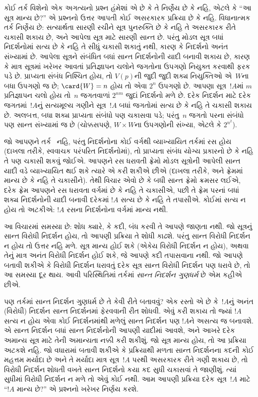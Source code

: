 કોઈ તર્ક વિશેનો એક અગત્યનો પ્રશ્ન હંમેશાં એ છે કે તે નિર્ણેય છે કે
નહિ, એટલે કે ``આ સૂત્ર માન્ય છે?'' એ પ્રશ્નનો ઉત્તર આપતી
કોઈ અસરકારક પ્રક્રિયા છે કે નહિ. વિધાનાત્મક તર્ક નિર્ણેય છે:
સત્યાર્થતા સારણી રચીને સૂત્ર પુનરુક્તિ છે કે નહિ તે
અસરકારક રીતે ચકાસી શકાય છે, અને આપેલા સૂત્ર માટે સારણી
સાન્ત છે. પરંતુ મોડલ સૂત્ર બધાં નિદર્શનોમાં સત્ય છે કે નહિ તે સીધું
ચકાસી શકાતું નથી, કારણ કે નિદર્શનો અનંત સંખ્યામાં છે. આપેલા સૂત્રને
સંબંધિત બધાં સાન્ત નિદર્શનોની યાદી બનાવી શકાય છે, કારણ કે માત્ર
સૂત્રમાં ખરેખર આવતાં પ્રતિજ્ઞાપન ચલોને જગતોના
ઉપગણો નિયુક્ત કરવાથી ફરક પડે છે. પ્રાપ્યતા સંબંધ નિશ્ચિત હોય, તો
$V(p)$ની જુદી જુદી શક્ય નિયુક્તિઓ એ~$W$ના બધા ઉપગણો જ છે;
$\card{W} = n$ હોય તો એવા $2^n$ ઉપગણો છે. આપણા
સૂત્ર~$!A$માં $m$ પ્રતિજ્ઞાપન ચલો હોય તો~$n$ જગતવાળાં $2^{nm}$ જુદાં નિદર્શનો મળે છે.
દરેક નિદર્શન માટે દરેક જગતમાં~$!A$નું સત્યમૂલ્ય ગણીને સૂત્ર~$!A$
બધાં જગતોમાં સત્ય છે કે નહિ તે ચકાસી શકાય છે. અલબત્ત, બધા શક્ય
પ્રાપ્યતા સંબંધો પણ ચકાસવા પડે; પરંતુ~$n$ જગતો પરના સંબંધો પણ
સાન્ત સંખ્યામાં જ છે (ચોક્કસપણે, $W \times W$ના ઉપગણોની સંખ્યા,
એટલે કે $2^{n^2}$).

જો આપણને તર્ક~ નહિ, પરંતુ નિદર્શનોના કોઈ વર્ગથી
વ્યાખ્યાયિત તર્કમાં રસ હોય (દાખલા તરીકે, સ્વવાચક પરંપરિત
નિદર્શનોમાં), તો પ્રાપ્યતા સંબંધ યોગ્ય પ્રકારનો છે કે નહિ તે પણ
ચકાસી શકવું જોઈએ. આપણને રસ ધરાવતી ફ્રેમો મોડલ સૂત્રોની
આપેલી સાન્ત યાદી વડે વ્યાખ્યાયિત થઈ શકે ત્યારે એ કરી શકીએ છીએ (દાખલા તરીકે,
 અને  ફ્રેમમાં માન્ય છે કે નહિ તે ચકાસીને). તેથી વિચાર
એવો છે કે બધી સાન્ત ફ્રેમો ક્રમસર લઈએ, દરેક ફ્રેમ આપણને રસ ધરાવતા
વર્ગમાં છે કે નહિ તે ચકાસીએ, પછી તે ફ્રેમ પરનાં બધાં શક્ય
નિદર્શનોની યાદી બનાવી દરેકમાં $!A$ સત્ય છે કે નહિ તે તપાસીએ.
કોઈમાં સત્ય ન હોય તો અટકીએ: $!A$ રસના નિદર્શનોના વર્ગમાં માન્ય
નથી.

આ વિચારમાં સમસ્યા છે: શોધ ક્યારે, કે કદી, બંધ કરવી તે આપણે જાણતા
નથી. જો સૂત્રનું સાન્ત વિરોધી નિદર્શન હોય, તો આપણી પ્રક્રિયા
તે શોધી કાઢશે. પરંતુ સાન્ત વિરોધી નિદર્શન ન હોય તો ઉત્તર નહિ મળે.
સૂત્ર માન્ય હોઈ શકે (એકેય વિરોધી નિદર્શન ન હોય), અથવા તેનું
માત્ર અનંત વિરોધી નિદર્શન હોઈ શકે, જે આપણે કદી તપાસવાના નથી.
જો આપણે બતાવી શકીએ કે વિરોધી નિદર્શન ધરાવતું દરેક સૂત્ર
સાન્ત વિરોધી નિદર્શન પણ ધરાવે છે, તો આ સમસ્યા દૂર થાય. આવી
પરિસ્થિતિમાં તર્કમાં \emph{સાન્ત નિદર્શન ગુણધર્મ} છે એમ કહીએ છીએ.

પણ તર્કમાં સાન્ત નિદર્શન ગુણધર્મ છે તે કેવી રીતે બતાવવું? એક રસ્તો
એ છે કે~$!A$નું અનંત (વિરોધી) નિદર્શન સાન્ત નિદર્શનમાં ફેરવવાની
રીત શોધવી. એવું કરી શકાય તો જ્યાં $!A$ સત્ય ન હોય એવા કોઈ
નિદર્શનમાંથી મળેલું સાન્ત નિદર્શન પણ $!A$ને અસત્ય જ બનાવશે.
એ સાન્ત નિદર્શન બધાં સાન્ત નિદર્શનોની આપણી યાદીમાં આવશે, અને
આખરે દરેક અમાન્ય સૂત્ર માટે તેની અમાન્યતા નક્કી કરી શકીશું.
જો સૂત્ર માન્ય હોય, તો આ પ્રક્રિયા અટકશે નહિ. જો વધારામાં બતાવી
શકીએ કે પ્રક્રિયાથી મળતા સાન્ત નિદર્શનના કદની કોઈ મહત્તમ મર્યાદા
છે અને તે મર્યાદા માત્ર સૂત્ર~$!A$ પરથી અસરકારક રીતે
ગણી શકાય છે, તો
વિરોધી નિદર્શન શોધતી વખતે સાન્ત નિદર્શનો કયા કદ સુધી ચકાસવાં
તે જાણીશું. ત્યાં સુધીમાં વિરોધી નિદર્શન ન મળે તો એવું કોઈ
નથી. આમ આપણી પ્રક્રિયા દરેક સૂત્ર~$!A$ માટે ``$!A$ માન્ય
છે?'' એ પ્રશ્નનો ખરેખર નિર્ણય કરશે.

